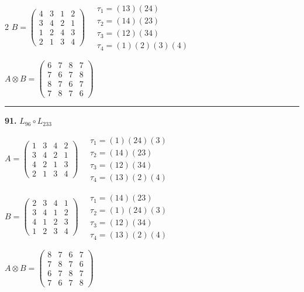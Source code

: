 \begin{multicols}{2}
$B = \begin{pmatrix} 4 & 3 & 1 & 2 \\ 3 & 4 & 2 & 1 \\ 1 & 2 & 4 & 3 \\ 2 & 1 & 3 & 4 \end{pmatrix} \quad \begin{matrix} \tau_{1}=(1 3)(2 4) \\ \tau_{2}=(1 4)(2 3) \\ \tau_{3}=(1 2)(3 4) \\ \tau_{4}=(1)(2)(3)(4) \end{matrix}$

$A \otimes B = \begin{pmatrix} 6 & 7 & 8 & 7 \\ 7 & 6 & 7 & 8 \\ 8 & 7 & 6 & 7 \\ 7 & 8 & 7 & 6 \end{pmatrix}$

\vspace{0.3em}
\hrule
\vspace{0.3em}

\noindent\textbf{91.} $L_{96} \circ L_{233}$

$A = \begin{pmatrix} 1 & 3 & 4 & 2 \\ 3 & 4 & 2 & 1 \\ 4 & 2 & 1 & 3 \\ 2 & 1 & 3 & 4 \end{pmatrix} \quad \begin{matrix} \tau_{1}=(1)(2 4)(3) \\ \tau_{2}=(1 4)(2 3) \\ \tau_{3}=(1 2)(3 4) \\ \tau_{4}=(1 3)(2)(4) \end{matrix}$

$B = \begin{pmatrix} 2 & 3 & 4 & 1 \\ 3 & 4 & 1 & 2 \\ 4 & 1 & 2 & 3 \\ 1 & 2 & 3 & 4 \end{pmatrix} \quad \begin{matrix} \tau_{1}=(1 4)(2 3) \\ \tau_{2}=(1)(2 4)(3) \\ \tau_{3}=(1 2)(3 4) \\ \tau_{4}=(1 3)(2)(4) \end{matrix}$

$A \otimes B = \begin{pmatrix} 8 & 7 & 6 & 7 \\ 7 & 8 & 7 & 6 \\ 6 & 7 & 8 & 7 \\ 7 & 6 & 7 & 8 \end{pmatrix}$


\end{multicols}

